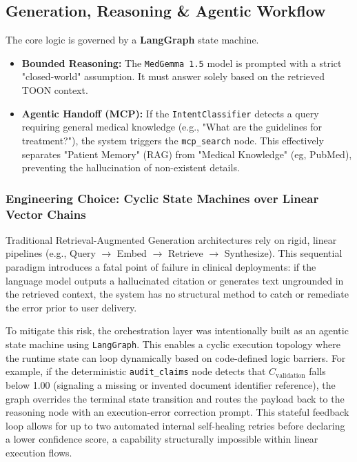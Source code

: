 



\subsection{Generation, Reasoning \& Agentic Workflow}
The core logic is governed by a \textbf{LangGraph} state machine.
\begin{itemize}
    \item \textbf{Bounded Reasoning:} The \texttt{MedGemma 1.5} model is prompted with a strict "closed-world" assumption. It must answer solely based on the retrieved TOON context.
    \item \textbf{Agentic Handoff (MCP):} If the \texttt{IntentClassifier} detects a query requiring general medical knowledge (e.g., "What are the guidelines for treatment?"), the system triggers the \texttt{mcp\_search} node. This effectively separates "Patient Memory" (RAG) from "Medical Knowledge" (eg, PubMed), preventing the hallucination of non-existent details.
\end{itemize}

\subsubsection{Engineering Choice: Cyclic State Machines over Linear Vector Chains}
Traditional Retrieval-Augmented Generation architectures rely on rigid, linear pipelines (e.g., Query $\rightarrow$ Embed $\rightarrow$ Retrieve $\rightarrow$ Synthesize). This sequential paradigm introduces a fatal point of failure in clinical deployments: if the language model outputs a hallucinated citation or generates text ungrounded in the retrieved context, the system has no structural method to catch or remediate the error prior to user delivery.

To mitigate this risk, the orchestration layer was intentionally built as an agentic state machine using \texttt{LangGraph}. This enables a cyclic execution topology where the runtime state can loop dynamically based on code-defined logic barriers. For example, if the deterministic \texttt{audit\_claims} node detects that $C_{\text{validation}}$ falls below 1.00 (signaling a missing or invented document identifier reference), the graph overrides the terminal state transition and routes the payload back to the reasoning node with an execution-error correction prompt. This stateful feedback loop allows for up to two automated internal self-healing retries before declaring a lower confidence score, a capability structurally impossible within linear execution flows.

